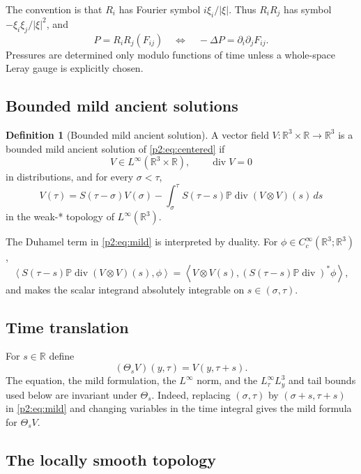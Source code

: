 \documentclass[11pt]{amsart}
\theoremstyle{plain}
\theoremstyle{definition}
\newtheorem{definition}[definition]{Definition}
\theoremstyle{remark}
\numberwithin{equation}{section}
\newcommand{\R}{\mathbb R}
\newcommand{\divergence}{\operatorname{div}}
\begin{document}
The convention is that \(R_i\) has Fourier symbol \(i\xi_i/|\xi|\).  Thus
\(R_iR_j\) has symbol \(-\xi_i\xi_j/|\xi|^2\), and
\[
   P=R_iR_j(F_{ij})
   \quad\Longleftrightarrow\quad
   -\Delta P=\partial_i\partial_jF_{ij}.
\]
Pressures are determined only modulo functions of time unless a whole-space
Leray gauge is explicitly chosen.

\subsection{Bounded mild ancient solutions}

\begin{definition}[Bounded mild ancient solution]\label{p2:def:mild}
A vector field \(V:\R^3\times\R\to\R^3\) is a bounded mild ancient solution of
\eqref{p2:eq:centered} if
\[
   V\in L^\infty(\R^3\times\R),\qquad \divergence V=0
\]
in distributions, and for every \(\sigma<\tau\),
\begin{equation}\label{p2:eq:mild}
   V(\tau)
   =
   S(\tau-\sigma)V(\sigma)
   -
   \int_\sigma^\tau
   S(\tau-s)\mathbb P\divergence(V\otimes V)(s)\,ds
\end{equation}
in the weak-* topology of \(L^\infty(\R^3)\).
\end{definition}

The Duhamel term in \eqref{p2:eq:mild} is interpreted by duality.  For
\(\phi\in C_c^\infty(\R^3;\R^3)\),
\[
   \left\langle
      S(\tau-s)\mathbb P\divergence(V\otimes V)(s),\phi
   \right\rangle
   =
   \left\langle
      V\otimes V(s),
      (S(\tau-s)\mathbb P\divergence)^*\phi
   \right\rangle ,
\]
and  makes the scalar integrand absolutely
integrable on \(s\in(\sigma,\tau)\).

\subsection{Time translation}

For \(s\in\R\) define
\[
   (\Theta_sV)(y,\tau)=V(y,\tau+s).
\]
The equation, the mild formulation, the \(L^\infty\) norm, and the
\(L^\infty_\tau L^3_y\) and tail bounds used below are invariant under
\(\Theta_s\).  Indeed, replacing \((\sigma,\tau)\) by
\((\sigma+s,\tau+s)\) in \eqref{p2:eq:mild} and changing variables in the time
integral gives the mild formula for \(\Theta_sV\).

\subsection{The locally smooth topology}
\end{document}
